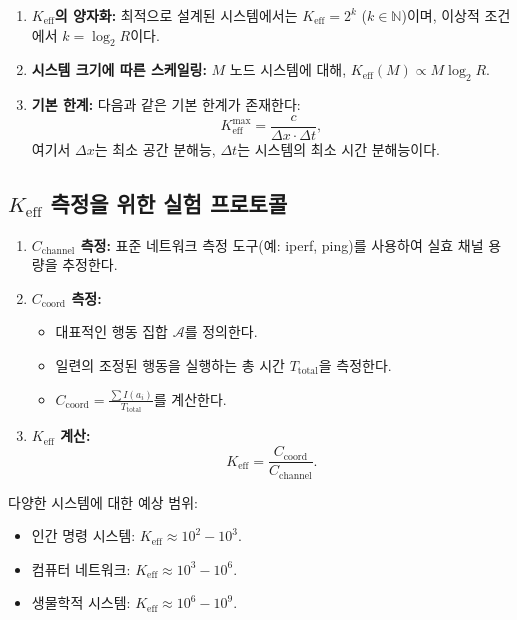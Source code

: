 \documentclass[12pt,a4paper]{article}
\begin{document}
	\begin{enumerate}
		\item \textbf{$K_{\mathrm{eff}}$의 양자화:} 최적으로 설계된 시스템에서는 $K_{\mathrm{eff}} = 2^k$ ($k \in \mathbb{N}$)이며, 이상적 조건에서 $k = \log_2 R$이다.
		
		\item \textbf{시스템 크기에 따른 스케일링:} $M$ 노드 시스템에 대해, $K_{\mathrm{eff}}(M) \propto M \log_2 R$.
		
		\item \textbf{기본 한계:} 다음과 같은 기본 한계가 존재한다:
		\[
		K_{\mathrm{eff}}^{\text{max}} = \frac{c}{\Delta x \cdot \Delta t},
		\]
		여기서 $\Delta x$는 최소 공간 분해능, $\Delta t$는 시스템의 최소 시간 분해능이다.
	\end{enumerate}
	
	\subsection{$K_{\mathrm{eff}}$ 측정을 위한 실험 프로토콜}
	\label{app:experiment}
	
	\begin{enumerate}
		\item \textbf{$C_{\text{channel}}$ 측정:} 표준 네트워크 측정 도구(예: iperf, ping)를 사용하여 실효 채널 용량을 추정한다.
		
		\item \textbf{$C_{\text{coord}}$ 측정:}
		\begin{itemize}
			\item 대표적인 행동 집합 $\mathcal{A}$를 정의한다.
			\item 일련의 조정된 행동을 실행하는 총 시간 $T_{\text{total}}$을 측정한다.
			\item $C_{\text{coord}} = \frac{\sum I(a_i)}{T_{\text{total}}}$를 계산한다.
		\end{itemize}
		
		\item \textbf{$K_{\mathrm{eff}}$ 계산:}
		\[
		K_{\mathrm{eff}} = \frac{C_{\text{coord}}}{C_{\text{channel}}}.
		\]
	\end{enumerate}
	
	다양한 시스템에 대한 예상 범위:
	\begin{itemize}
		\item 인간 명령 시스템: $K_{\mathrm{eff}} \approx 10^2 - 10^3$.
		\item 컴퓨터 네트워크: $K_{\mathrm{eff}} \approx 10^3 - 10^6$.
		\item 생물학적 시스템: $K_{\mathrm{eff}} \approx 10^6 - 10^9$.
	\end{itemize}
	
\end{document}
